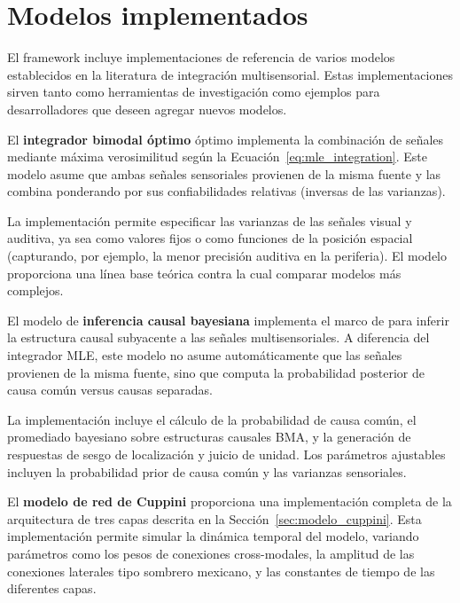 \section{Modelos implementados}
\label{sec:snmsi_modelos}

El framework incluye implementaciones de referencia de varios modelos establecidos en la literatura de integración multisensorial. Estas implementaciones sirven tanto como herramientas de investigación como ejemplos para desarrolladores que deseen agregar nuevos modelos.

\medskip
El \textbf{integrador bimodal óptimo} óptimo implementa la combinación de señales mediante máxima verosimilitud según la Ecuación~\ref{eq:mle_integration}. Este modelo asume que ambas señales sensoriales provienen de la misma fuente y las combina ponderando por sus confiabilidades relativas (inversas de las varianzas).

La implementación permite especificar las varianzas de las señales visual y auditiva, ya sea como valores fijos o como funciones de la posición espacial (capturando, por ejemplo, la menor precisión auditiva en la periferia). El modelo proporciona una línea base teórica contra la cual comparar modelos más complejos.

\medskip
El modelo de \textbf{inferencia causal bayesiana} implementa el marco de \citet{kording2007causal} para inferir la estructura causal subyacente a las señales multisensoriales. A diferencia del integrador MLE, este modelo no asume automáticamente que las señales provienen de la misma fuente, sino que computa la probabilidad posterior de causa común versus causas separadas.

La implementación incluye el cálculo de la probabilidad de causa común, el promediado bayesiano sobre estructuras causales \acrfull{BMA}, y la generación de respuestas de sesgo de localización y juicio de unidad. Los parámetros ajustables incluyen la probabilidad prior de causa común y las varianzas sensoriales.

\medskip
El \textbf{modelo de red de Cuppini} proporciona una implementación completa de la arquitectura de tres capas descrita en la Sección~\ref{sec:modelo_cuppini}. Esta implementación permite simular la dinámica temporal del modelo, variando parámetros como los pesos de conexiones cross-modales, la amplitud de las conexiones laterales tipo sombrero mexicano, y las constantes de tiempo de las diferentes capas.

